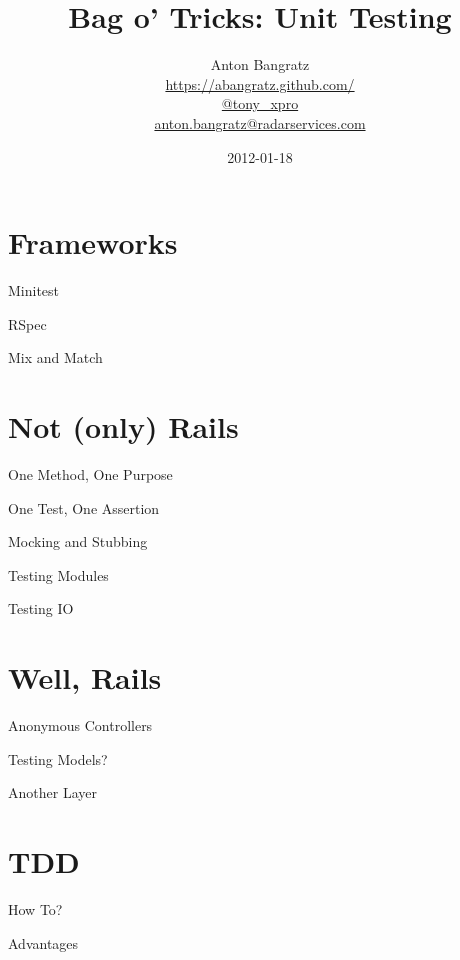 \documentclass[style=husky,display=slides,clock]{powerdot}
\title{Bag o' Tricks: Unit Testing}
\author{Anton Bangratz\\
	\url{https://abangratz.github.com/}\\
	\url{@tony_xpro}\\
\url{anton.bangratz@radarservices.com}}
\date{2012-01-18}
\begin{document}
\maketitle
\section{Frameworks}
\begin{slide}{Minitest}
\end{slide}
\begin{slide}{RSpec}
\end{slide}
\begin{slide}{Mix and Match}
\end{slide}
\section{Not (only) Rails}
\begin{slide}{One Method, One Purpose}
\end{slide}
\begin{slide}{One Test, One Assertion}
\end{slide}
\begin{slide}{Mocking and Stubbing}
\end{slide}
\begin{slide}{Testing Modules}
\end{slide}
\begin{slide}{Testing IO}
\end{slide}
\section{Well, Rails}
\begin{slide}{Anonymous Controllers}
\end{slide}
\begin{slide}{Testing Models?}
\end{slide}
\begin{slide}{Another Layer}
\end{slide}
\section{TDD}
\begin{slide}{How To?}
\end{slide}
\begin{slide}{Advantages}
\end{slide}
\end{document}
